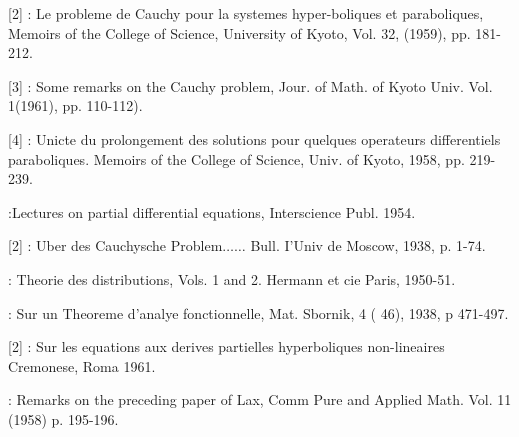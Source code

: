 \begin{thebibliography}{99}
{[2]} : Le probleme de Cauchy pour la systemes
   hyper-boliques et paraboliques, Memoirs of the  College of Science,
   University of Kyoto, Vol. 32, (1959), pp. 181-212. 

{[3]} : Some remarks on the Cauchy problem, Jour. of
   Math. of Kyoto Univ. Vol. 1(1961), pp. 110-112). 

{[4]} : Unicte du prolongement des solutions pour quelques
   operateurs differentiels paraboliques. Memoirs of the College of
   Science, Univ. of Kyoto, 1958, pp. 219-239. 

  :\pageoriginale  Lectures on
   partial differential 
   equations, Interscience Publ. 1954. 

{[2]} : Uber des Cauchysche Problem$\ldots \ldots $
   Bull. I'Univ de Moscow, 1938, p. 1-74. 

  : Theorie des distributions, Vols. 1
   and 2. Hermann et cie Paris, 1950-51. 

  : Sur un Theoreme d'analye
   fonctionnelle, Mat. Sbornik, 4 ( 46), 1938, p 471-497. 

{[2]} : Sur les equations aux derives partielles
   hyperboliques non-lineaires Cremonese, Roma 1961. 

  : Remarks on the preceding paper
   of Lax, Comm Pure and Applied Math. Vol. 11 (1958) p. 195-196. 
\end{thebibliography}

